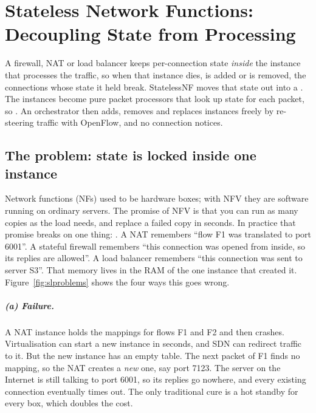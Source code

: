 \chapter{Stateless Network Functions: Decoupling State from Processing}

\begin{keybox}
A firewall, NAT or load balancer keeps per-connection state \emph{inside} the instance that processes the traffic, so when that
instance dies, is added or is removed, the connections whose state it held break. StatelessNF moves that state out into a
. The instances become pure packet processors that look up state for each packet,
so . An orchestrator then adds, removes and replaces instances freely by re-steering
traffic with OpenFlow, and no connection notices.
\end{keybox}

\section{The problem: state is locked inside one instance}

Network functions (NFs) used to be hardware boxes; with NFV they are software running on ordinary servers. The promise of NFV is
that you can run as many copies as the load needs, and replace a failed copy in seconds. In practice that promise breaks on one
thing: . A NAT remembers ``flow F1 was translated to port 6001''. A stateful firewall remembers ``this connection was
opened from inside, so its replies are allowed''. A load balancer remembers ``this connection was sent to server S3''. That memory
lives in the RAM of the one instance that created it. Figure~\ref{fig:slproblems} shows the four ways this goes wrong.


\paragraph{(a) Failure.} A NAT instance holds the mappings for flows F1 and F2 and then crashes. Virtualisation can start a new
instance in seconds, and SDN can redirect traffic to it. But the new instance has an empty table. The next packet of F1 finds no
mapping, so the NAT creates a \emph{new} one, say port 7123. The server on the Internet is still talking to port 6001, so its replies
go nowhere, and every existing connection eventually times out. The only traditional cure is a hot standby for every box, which doubles
the cost.

